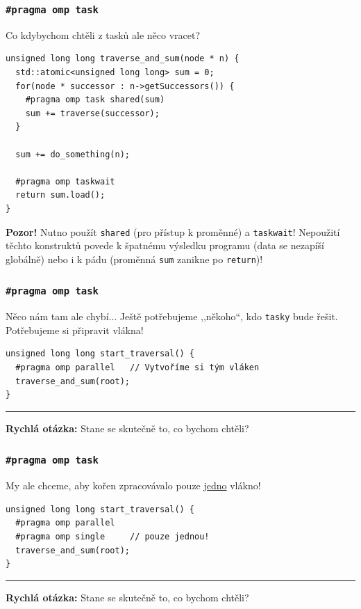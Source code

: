 \documentclass[usenames,dvipsnames,9pt]{beamer}
\begin{document}
\begin{frame}[fragile]
	\frametitle{\texttt{\#pragma omp task}}
	Co kdybychom chtěli z tasků ale něco vracet?

	\begin{verbatim}
unsigned long long traverse_and_sum(node * n) {
  std::atomic<unsigned long long> sum = 0;
  for(node * successor : n->getSuccessors()) {
    #pragma omp task shared(sum)
    sum += traverse(successor);
  }

  sum += do_something(n);
  
  #pragma omp taskwait
  return sum.load();
}
 	\end{verbatim}

	\faWarning \hspace{2pt} \textbf{Pozor!} Nutno použít \texttt{shared} (pro přístup k proměnné) a \texttt{taskwait}!
	Nepoužití těchto konstruktů povede k špatnému výsledku programu (data se nezapíší globálně) nebo i k pádu (proměnná \texttt{sum} zanikne po \texttt{return})!
\end{frame}

\begin{frame}[fragile]
	\frametitle{\texttt{\#pragma omp task}}
	Něco nám tam ale chybí... Ještě potřebujeme ,,někoho``, kdo \texttt{tasky} bude řešit. Potřebujeme si připravit vlákna!

	\begin{verbatim}
unsigned long long start_traversal() {
  #pragma omp parallel   // Vytvoříme si tým vláken
  traverse_and_sum(root);
}
 	\end{verbatim}

 	\pause
 	\vspace{2em}\hrule\vspace{1em}

 	\large\textbf{Rychlá otázka:} Stane se skutečně to, co bychom chtěli?
\end{frame}

\begin{frame}[fragile]
	\frametitle{\texttt{\#pragma omp task}}
	My ale chceme, aby kořen zpracovávalo pouze \underline{jedno} vlákno!

	\vspace{2em}

	\begin{verbatim}
unsigned long long start_traversal() {
  #pragma omp parallel
  #pragma omp single     // pouze jednou!
  traverse_and_sum(root);
}
 	\end{verbatim}

 	\pause
 	\vspace{1em}\hrule\vspace{1em}

 	\large\textbf{Rychlá otázka:} Stane se skutečně to, co bychom chtěli?
\end{frame}
\end{document}
